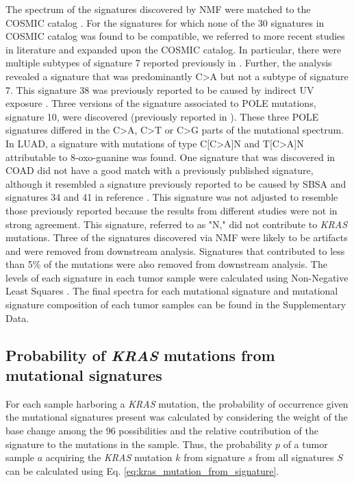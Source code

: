 \documentclass[english, 10pt, letterpaper]{article}
\newcommand{\KRAS}{\emph{KRAS}}
\begin{document}
The spectrum of the signatures discovered by NMF were matched to the COSMIC catalog \cite{Tate2019}.
For the signatures for which none of the 30 signatures in COSMIC catalog was found to be compatible, we referred to more recent studies in literature and expanded upon the COSMIC catalog. 
In particular, there were multiple subtypes of signature 7 reported previously in \cite{Hayward2017Whole-genomeSubtypes., Alexandrov2020TheCancer.}.
Further, the analysis revealed a signature that was predominantly C>A but not a subtype of signature 7.
This signature 38 was previously reported to be caused by indirect UV exposure \cite{Alexandrov2020TheCancer.}. 
Three versions of the signature associated to POLE mutations, signature 10, were discovered (previously reported in \cite{Alexandrov2020TheCancer.}).
These three POLE signatures differed in the C>A, C>T or C>G parts of the mutational spectrum. 
In LUAD, a signature with mutations of type C[C>A]N and T[C>A]N attributable to 8-oxo-guanine \cite{Alexandrov2020TheCancer.} was found. 
One signature that was discovered in COAD did not have a good match with a previously published signature, although it resembled a signature previously reported to be caused by SBSA \cite{Lee-Six2019} and signatures 34 and 41 in reference \cite{Alexandrov2020TheCancer.}. 
This signature was not adjusted to resemble those previously reported because the results from different studies were not in strong agreement.
This signature, referred to as "N," did not contribute to \KRAS{} mutations.
Three of the signatures discovered via NMF were likely to be artifacts \cite{Costello2013DiscoveryPreparation.} and were removed from downstream analysis. 
Signatures that contributed to less than 5\% of the mutations were also removed from downstream analysis. 
The levels of each signature in each tumor sample were calculated using Non-Negative Least Squares \cite{Gulhan2019DetectingSamples.}.
The final spectra for each mutational signature and mutational signature composition of each tumor samples can be found in the Supplementary Data.


\subsection*{Probability of \KRAS{} mutations from mutational signatures}

For each sample harboring a \KRAS{} mutation, the probability of occurrence given the mutational signatures present was calculated by considering the weight of the base change among the 96 possibilities and the relative contribution of the signature to the mutations in the sample. 
Thus, the probability $p$ of a tumor sample $a$ acquiring the \KRAS{} mutation $k$ from signature $s$ from all signatures $S$ can be calculated using Eq. \ref{eq:kras_mutation_from_signature}.
\end{document}
